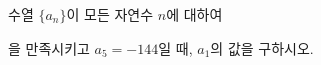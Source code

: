 \hspace*{2mm}\begin{minipage}[t]{\dimexpr\linewidth-2mm\relax}\vspace{0pt}
수열 $\{a_n\}$이 모든 자연수 $n$에 대하여 \par\smallskip{}\par\smallskip\noindent 을 만족시키고 $a_5=-144$일 때, $a_1$의 값을 구하시오.\end{minipage}
